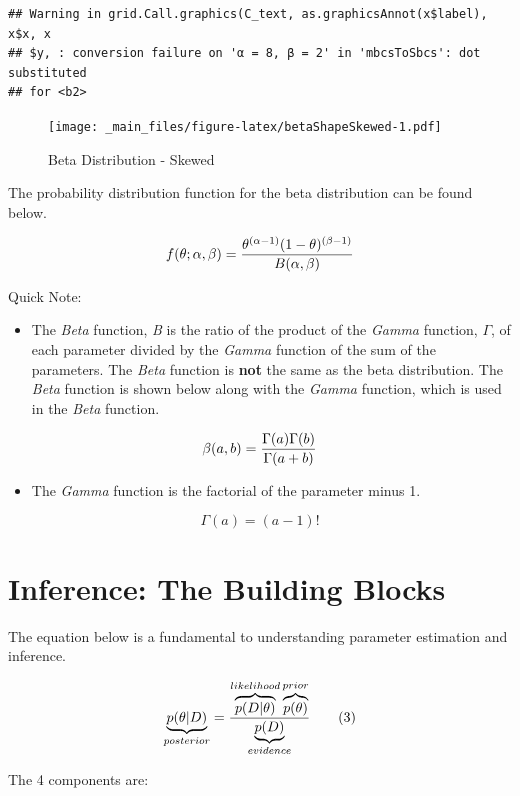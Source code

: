 \documentclass[]{book}
\providecommand{\tightlist}{%
  \setlength{\itemsep}{0pt}\setlength{\parskip}{0pt}}
\theoremstyle{definition}
\theoremstyle{definition}
\theoremstyle{definition}
\theoremstyle{remark}
\begin{document}
\begin{verbatim}
## Warning in grid.Call.graphics(C_text, as.graphicsAnnot(x$label), x$x, x
## $y, : conversion failure on 'α = 8, β = 2' in 'mbcsToSbcs': dot substituted
## for <b2>
\end{verbatim}

\begin{figure}
\centering
\texttt{[image: \_main\_files/figure-latex/betaShapeSkewed-1.pdf]}
\caption{\label{fig:betaShapeSkewed}Beta Distribution - Skewed}
\end{figure}

The probability distribution function for the beta distribution can be
found below.

\[
f(\theta;\alpha,\beta) ={{\theta^{(\alpha-1)}(1-\theta)^{(\beta-1)}}\over B(\alpha,\beta)}
\]

Quick Note:

\begin{itemize}
\tightlist
\item
  The \emph{Beta} function, \emph{B} is the ratio of the product of the
  \emph{Gamma} function, \(\Gamma\), of each parameter divided by the
  \emph{Gamma} function of the sum of the parameters. The \emph{Beta}
  function is \textbf{not} the same as the beta distribution. The
  \emph{Beta} function is shown below along with the \emph{Gamma}
  function, which is used in the \emph{Beta} function.
\end{itemize}

\[
\beta(a,b) = {\Gamma(a)\Gamma(b) \over{\Gamma(a+b)}}
\]

\begin{itemize}
\tightlist
\item
  The \emph{Gamma} function is the factorial of the parameter minus 1.
\end{itemize}

\[
\Gamma(a) = (a-1)!
\]

\section{Inference: The Building
Blocks}\label{inference-the-building-blocks}

The equation below is a fundamental to understanding parameter
estimation and inference.

\[
\underbrace{p(\theta|D)}_{posterior} = {\overbrace{p(D|\theta)}^{likelihood}
  \overbrace{p(\theta)}^{prior} \over \underbrace{p(D)}_{evidence}}
\tag{3}
\]

The 4 components are:
\end{document}
